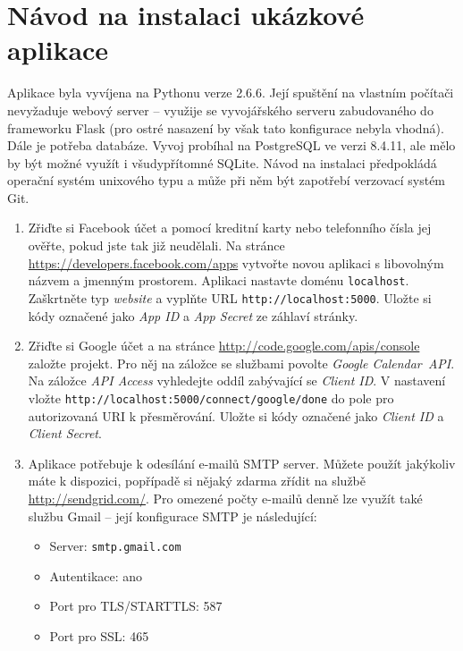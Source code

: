 \documentclass[12pt,oneside,final]{fithesis2}
\begin{document}
\chapter{Návod na instalaci ukázkové aplikace}\label{tutorial}
Aplikace byla vyvíjena na Pythonu verze 2.6.6. Její spuštění na vlastním počítači nevyžaduje webový server -- využije se vyvojářského serveru zabudovaného do frameworku Flask (pro ostré nasazení by však tato konfigurace nebyla vhodná). Dále je potřeba databáze. Vyvoj probíhal na PostgreSQL ve verzi 8.4.11, ale mělo by být možné využít i všudypřítomné SQLite. Návod na instalaci předpokládá operační systém unixového typu a může při něm být zapotřebí verzovací systém Git.

\begin{enumerate}
    \item Zřiďte si Facebook účet a pomocí kreditní karty nebo telefonního čísla jej ověřte, pokud jste tak již neudělali. Na stránce \url{https://developers.facebook.com/apps} vytvořte novou aplikaci s libovolným názvem a jmenným prostorem. Aplikaci nastavte doménu {\tt localhost}. Zaškrtněte typ \emph{website} a vyplňte URL {\tt http://localhost:5000}. Uložte si kódy označené jako \emph{App ID} a \emph{App Secret} ze záhlaví stránky.

    \item Zřiďte si Google účet a na stránce \url{http://code.google.com/apis/console} založte projekt. Pro něj na záložce se službami povolte \emph{Google Calendar~API}. Na záložce \emph{API Access} vyhledejte oddíl zabývající se \emph{Client ID}. V nastavení vložte {\tt http://localhost:5000/connect/google/done} do pole pro autorizovaná URI k přesměrování. Uložte si kódy označené jako \emph{Client ID} a \emph{Client Secret}.

    \item Aplikace potřebuje k odesílání e-mailů SMTP server. Můžete použít jakýkoliv máte k dispozici, popřípadě si nějaký zdarma zřídit na službě \url{http://sendgrid.com/}. Pro omezené počty e-mailů denně lze využít také službu Gmail -- její konfigurace SMTP je následující:

        \begin{itemize}
            \item Server: {\tt smtp.gmail.com}
            \item Autentikace: ano
            \item Port pro TLS/STARTTLS: 587
            \item Port pro SSL: 465
        \end{itemize}


\end{enumerate}
\end{document}
